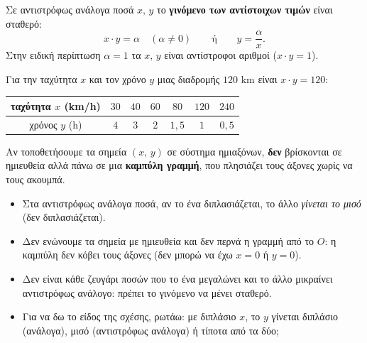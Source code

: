Σε αντιστρόφως ανάλογα ποσά $x,\,y$ το \textbf{γινόμενο των αντίστοιχων τιμών} είναι σταθερό:
$$x\cdot y=\alpha\quad(\alpha\neq0)\qquad\text{ή}\qquad y=\dfrac{\alpha}{x}.$$
Στην ειδική περίπτωση $\alpha=1$ τα $x,\,y$ είναι αντίστροφοι αριθμοί ($x\cdot y=1$).


Για την ταχύτητα $x$ και τον χρόνο $y$ μιας διαδρομής $120$ km είναι $x\cdot y=120$:
\begin{center}
\renewcommand{\arraystretch}{1.3}
\begin{tabular}{c|cccccc}
ταχύτητα $x$ (km/h) & $30$ & $40$ & $60$ & $80$ & $120$ & $240$\\\hline
χρόνος $y$ (h) & $4$ & $3$ & $2$ & $1{,}5$ & $1$ & $0{,}5$
\end{tabular}
\end{center}
Αν τοποθετήσουμε τα σημεία $(x,\,y)$ σε σύστημα ημιαξόνων, \textbf{δεν} βρίσκονται σε ημιευθεία αλλά πάνω σε μια \textbf{καμπύλη γραμμή}, που πλησιάζει τους άξονες χωρίς να τους ακουμπά.

\begin{center}
\end{center}

\begin{prosoxi}
\begin{itemize}[leftmargin=1.2em,itemsep=0.3ex,topsep=2pt]
\item Στα αντιστρόφως ανάλογα ποσά, αν το ένα διπλασιάζεται, το άλλο \emph{γίνεται το μισό} (δεν διπλασιάζεται).
\item Δεν ενώνουμε τα σημεία με ημιευθεία και δεν περνά η γραμμή από το $O$: η καμπύλη δεν κόβει τους άξονες (δεν μπορώ να έχω $x=0$ ή $y=0$).
\item Δεν είναι κάθε ζευγάρι ποσών που το ένα μεγαλώνει και το άλλο μικραίνει αντιστρόφως ανάλογο: πρέπει το γινόμενο να μένει σταθερό.
\item Για να δω το είδος της σχέσης, ρωτάω: με διπλάσιο $x$, το $y$ γίνεται διπλάσιο (ανάλογα), μισό (αντιστρόφως ανάλογα) ή τίποτα από τα δύο;
\end{itemize}
\end{prosoxi}

